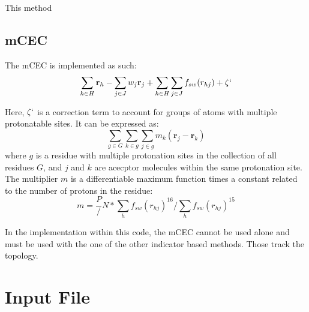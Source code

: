 \documentclass{article}
\begin{document}
This method

\subsection{mCEC}
The mCEC is implemented as such:
\begin{equation}
\sum_{h \in H} \mathbf{r}_h - \sum_{j \in J} w_j \mathbf{r}_j + \sum_{h \in H} \sum_{j \in J} f_{sw}(r_{hj}) + \zeta`
\end{equation}

Here, $\zeta`$ is a correction term to account for groups of atoms with multiple protonatable sites. It can be expressed as:
\begin{equation}
\sum_{g \in G} \sum_{k\in g}\sum_{j \in g}m_k (\mathbf{r}_j - \mathbf{r}_k)
\end{equation}
where $g$ is a residue with multiple protonation sites in the collection of all residues $G$, and $j$ and $k$ are acecptor molecules within the same protonation site. 
The multiplier $m$ is a differentiable maximum function times a constant related to the number of protons in the residue:
\begin{equation}
m = \frac{P}/{N} * \sum_h f_{sw}(r_{hj})^{16} / \sum_h f_{sw}(r_{hj})^{15}
\end{equation}

In the implementation within this code, the mCEC cannot be used alone and must be used with the one of the other indicator based methods. Those track the topology.


\section{Input File}
\end{document}
